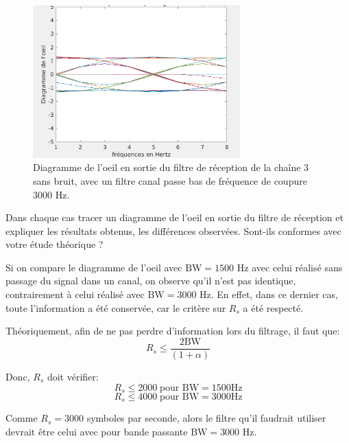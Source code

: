 \documentclass[frenchb]{article}
\begin{document}
\begin{enumerate}
\begin{enumerate}
                \begin{figure}[ht!]
				\centering
				\includegraphics[width=8cm]{C3F622.png}		              	\caption{Diagramme de l'oeil en sortie du filtre de réception de la chaîne 3 sans bruit, avec un filtre canal passe bas de fréquence de coupure $3000$ Hz. \label{fig : C3F622}}
				\end{figure}
				\par\leavevmode\par
            \end{enumerate}
            Dans chaque cas tracer un diagramme de l'oeil en sortie du filtre de réception et expliquer les résultats obtenus, les différences observées. Sont-ils conformes avec votre étude théorique ?
            \par\leavevmode\par
            \setlength\parindent{0.5cm}
            Si on compare le diagramme de l'oeil avec $\text{BW} = 1500$ Hz avec celui réalisé sans passage du signal dans un canal, on observe qu'il n'est pas identique, contrairement à celui réalisé avec $\text{BW} = 3000$ Hz. En effet, dans ce dernier cas, toute l'information a été conservée, car le critère sur $R_s$ a été respecté.
            
            Théoriquement, afin de ne pas perdre d'information lors du filtrage, il faut que:
    $$R_s \leq \frac{2 \text{BW}}{(1 + \alpha)}$$
    
    Donc, $R_s$ doit vérifier:  
    $$ R_s \leq 2000 \; \text{pour BW} = 1500 \text{Hz} $$
    $$ R_s \leq 4000 \; \text{pour BW} = 3000 \text{Hz} $$
    
    Comme $R_s = 3000$ symboles par seconde, alors le filtre qu'il faudrait utiliser devrait être celui avec pour bande passante $\text{BW} = 3000$ Hz. 
            
    \end{enumerate}

\end{document}

